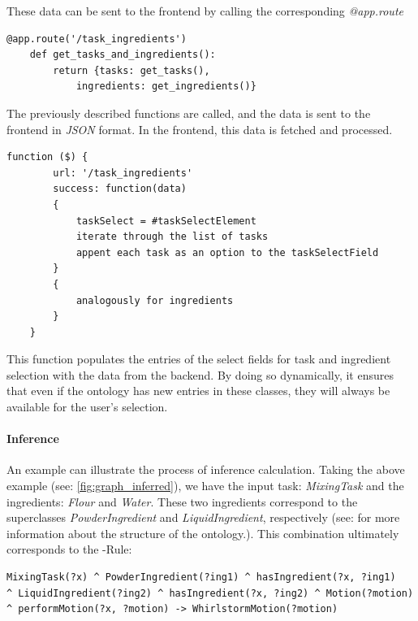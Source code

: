 These data can be sent to the frontend by calling the corresponding \textit{@app.route}

\begin{lstlisting}[caption={Sending task and ingredients list to the frontend},captionpos=b]
    @app.route('/task_ingredients')
    def get_tasks_and_ingredients():
        return {tasks: get_tasks(), 
            ingredients: get_ingredients()} 

\end{lstlisting}

The previously described functions are called, and the data is sent to the frontend in \textit{JSON} format. In the frontend, this data is fetched and processed.

\begin{lstlisting}[caption={Fetch and populate select fields},captionpos=b]
    function ($) {
        url: '/task_ingredients'
        success: function(data)
        {
            taskSelect = #taskSelectElement
            iterate through the list of tasks
            appent each task as an option to the taskSelectField
        }
        {
            analogously for ingredients
        }
    }

\end{lstlisting}



This function populates the entries of the select fields for task and ingredient selection with the data from the backend. 
By doing so dynamically, it ensures that even if the ontology has new entries in these classes, they will always be available for the user's selection.

\paragraph{Inference}
\label{par:Inference}

An example can illustrate the process of inference calculation. Taking the above example (see: \ref{fig:graph_inferred}), we have the input task: \textit{MixingTask} and the ingredients: \textit{Flour} and \textit{Water}. 
These two ingredients correspond to the superclasses \textit{PowderIngredient} and \textit{LiquidIngredient}, respectively (see:  for more information 
about the structure of the ontology.). This combination ultimately corresponds to the -Rule:
\begin{lstlisting}
MixingTask(?x) ^ PowderIngredient(?ing1) ^ hasIngredient(?x, ?ing1)
^ LiquidIngredient(?ing2) ^ hasIngredient(?x, ?ing2) ^ Motion(?motion) 
^ performMotion(?x, ?motion) -> WhirlstormMotion(?motion)
\end{lstlisting}

